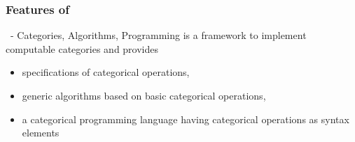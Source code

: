 \begin{frame}
\frametitle{Features of \CapPkg}

\begin{block}{\CapPkg\ - Categories, Algorithms, Programming}
 \pause
  \CapPkg is a framework to implement computable categories and provides \pause
  \begin{itemize}
   \item specifications of categorical operations, \pause
   \item generic algorithms based on basic categorical operations,  \pause
   \item a categorical programming language having categorical operations as syntax elements
 \end{itemize}
\end{block}
\end{frame}

